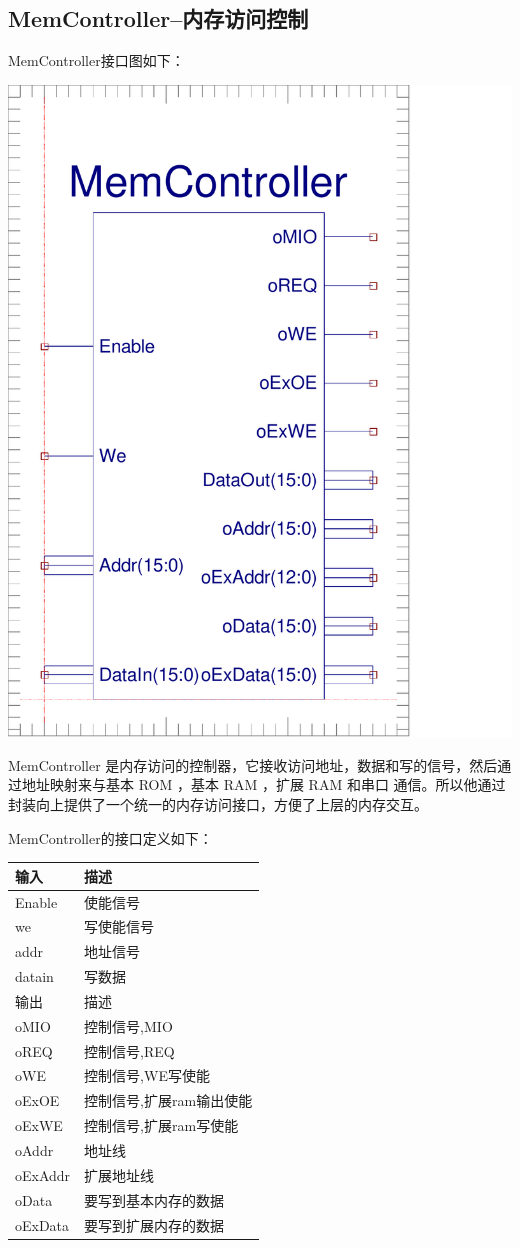\documentclass[10pt]{article}
\begin{document}
\begin{CJK}{UTF8}{gbsn}
\subsection{MemController--内存访问控制}
MemController接口图如下：\\
\begin{center}
\includegraphics[width=0.5\linewidth]{MemController.pdf}
\end{center}
MemController 是内存访问的控制器，它接收访问地址，数据和写的信号，然后通过地址映射来与基本  ROM ，基本 RAM ，扩展 RAM 和串口
通信。所以他通过封装向上提供了一个统一的内存访问接口，方便了上层的内存交互。

MemController的接口定义如下：\\
\begin{center}
\begin{tabular}{|l|l|}\hline
输入&描述\\\hline
Enable&使能信号\\\hline
we&写使能信号\\\hline
addr&地址信号\\\hline
datain&写数据\\\hline\hline
输出&描述\\\hline
oMIO&控制信号,MIO\\\hline
oREQ&控制信号,REQ\\\hline
oWE&控制信号,WE写使能\\\hline
oExOE&控制信号,扩展ram输出使能\\\hline
oExWE&控制信号,扩展ram写使能\\\hline
oAddr&地址线\\\hline
oExAddr&扩展地址线\\\hline
oData&要写到基本内存的数据\\\hline
oExData&要写到扩展内存的数据\\\hline
\end{tabular}
\end{center}


\end{CJK}
\end{document}
